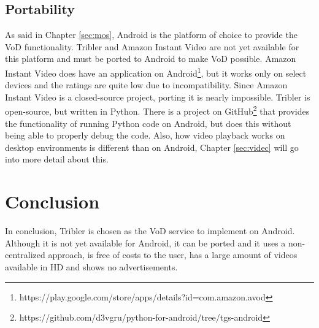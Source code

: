 \subsection{Portability}
As said in Chapter \ref{sec:mos}, Android is the platform of choice to provide the VoD functionality. Tribler and Amazon Instant Video are not yet available for this platform and must be ported to Android to make VoD possible. Amazon Instant Video does have an application on Android\footnote{https://play.google.com/store/apps/details?id=com.amazon.avod}, but it works only on select devices and the ratings are quite low due to incompatibility. Since Amazon Instant Video is a closed-source project, porting it is nearly impossible. Tribler is open-source, but written in Python. There is a project on GitHub\footnote{https://github.com/d3vgru/python-for-android/tree/tgs-android} that provides the functionality of running Python code on Android, but does this without being able to properly debug the code. Also, how video playback works on desktop environments is different than on Android, Chapter \ref{sec:videc} will go into more detail about this.
\section{Conclusion}
In conclusion, Tribler is chosen as the VoD service to implement on Android. Although it is not yet available for Android, it can be ported and it uses a non-centralized approach, is free of costs to the user, has a large amount of videos available in HD and shows no advertisements.